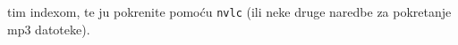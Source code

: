 \documentclass{exam}
\newcommand{\shell}[1]{\texttt{#1}}
\begin{document}
\begin{itemize}
                                                                                                                                                                                                        tim
                                                                                                                                                                                                        indexom,
                                                                                                                                                                                                        te
                                                                                                                                                                                                        ju
                                                                                                                                                                                                        pokrenite
                                                                                                                                                                                                        pomoću
                                                                                                                                                                                                        \shell{nvlc}
                                                                                                                                                                                                        (ili
                                                                                                                                                                                                        neke
                                                                                                                                                                                                        druge
                                                                                                                                                                                                        naredbe
                                                                                                                                                                                                        za
                                                                                                                                                                                                        pokretanje
                                                                                                                                                                                                        mp3
                                                                                                                                                                                                        datoteke).
                                                                                                \end{itemize}

                                                                                            
\end{document}

